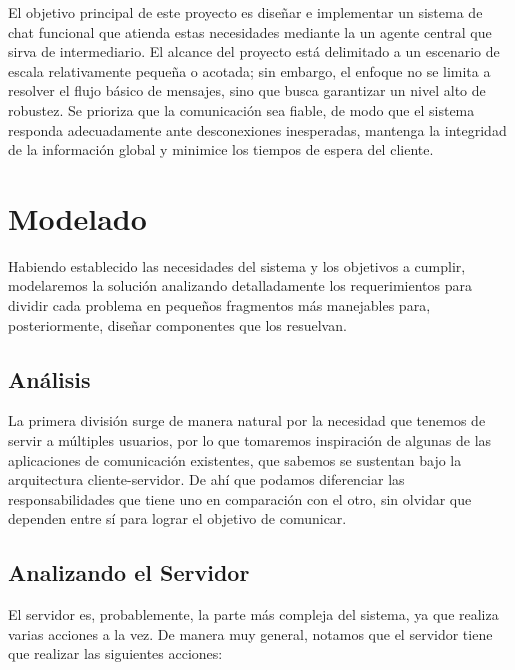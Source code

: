 \documentclass{replab}
\begin{document}
    El objetivo principal de este proyecto es diseñar e implementar un
    sistema de chat funcional que atienda estas necesidades mediante
    la un agente central que sirva de intermediario. El alcance del
    proyecto está delimitado a un escenario de escala relativamente
    pequeña o acotada; sin embargo, el enfoque no se limita a resolver
    el flujo básico de mensajes, sino que busca garantizar un nivel
    alto de robustez. Se prioriza que la comunicación sea fiable, de
    modo que el sistema responda adecuadamente ante desconexiones
    inesperadas, mantenga la integridad de la información global y
    minimice los tiempos de espera del cliente. 
    
	\section{Modelado}

    Habiendo establecido las necesidades del sistema y los objetivos a
    cumplir, modelaremos la solución analizando detalladamente los
    requerimientos para dividir cada problema en pequeños fragmentos
    más manejables para, posteriormente, diseñar componentes que los
    resuelvan.
	
	\subsection{Análisis}

    La primera división surge de manera natural por la necesidad que
    tenemos de servir a múltiples usuarios, por lo que tomaremos
    inspiración de algunas de las aplicaciones de comunicación
    existentes, que sabemos se sustentan bajo la arquitectura
    cliente-servidor. De ahí que podamos diferenciar las
    responsabilidades que tiene uno en comparación con el otro, sin
    olvidar que dependen entre sí para lograr el objetivo de
    comunicar.

    \subsection{Analizando el Servidor}

    El servidor es, probablemente, la parte más compleja del sistema,
    ya que realiza varias acciones a la vez. De manera muy general,
    notamos que el servidor tiene que realizar las siguientes
    acciones:
\end{document}

